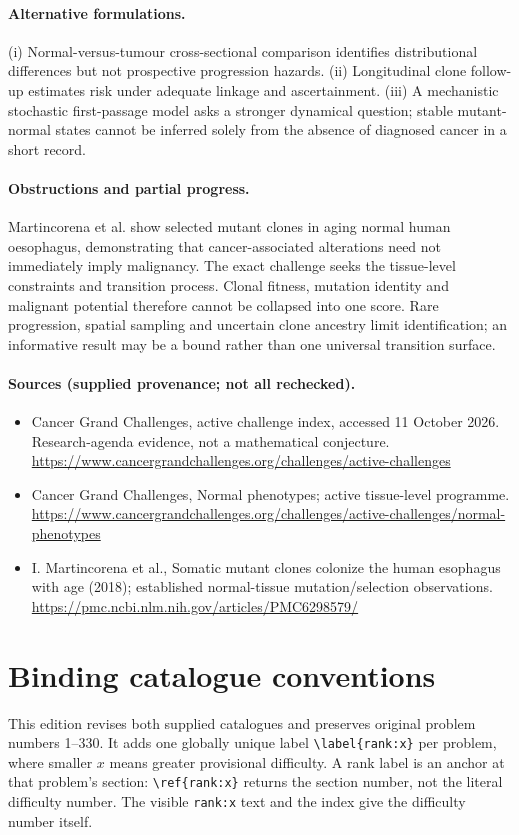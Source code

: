 \documentclass[11pt]{article}
\begin{document}
\paragraph{Alternative formulations.} (i) Normal-versus-tumour cross-sectional comparison identifies distributional differences but not prospective progression hazards. (ii) Longitudinal clone follow-up estimates risk under adequate linkage and ascertainment. (iii) A mechanistic stochastic first-passage model asks a stronger dynamical question; stable mutant-normal states cannot be inferred solely from the absence of diagnosed cancer in a short record.
\paragraph{Obstructions and partial progress.} Martincorena et al. show selected mutant clones in aging normal human oesophagus, demonstrating that cancer-associated alterations need not immediately imply malignancy. The exact challenge seeks the tissue-level constraints and transition process. Clonal fitness, mutation identity and malignant potential therefore cannot be collapsed into one score. Rare progression, spatial sampling and uncertain clone ancestry limit identification; an informative result may be a bound rather than one universal transition surface.
\paragraph{Sources (supplied provenance; not all rechecked).}
\begin{itemize}
\item Cancer Grand Challenges, active challenge index, accessed 11 October 2026. Research-agenda evidence, not a mathematical conjecture. \url{https://www.cancergrandchallenges.org/challenges/active-challenges}
\item Cancer Grand Challenges, Normal phenotypes; active tissue-level programme. \url{https://www.cancergrandchallenges.org/challenges/active-challenges/normal-phenotypes}
\item I. Martincorena et al., Somatic mutant clones colonize the human esophagus with age (2018); established normal-tissue mutation/selection observations. \url{https://pmc.ncbi.nlm.nih.gov/articles/PMC6298579/}
\end{itemize}


\section*{Binding catalogue conventions}
This edition revises both supplied catalogues and preserves original problem numbers 1--330. It adds one globally unique label \verb|\label{rank:x}| per problem, where smaller $x$ means greater provisional difficulty. A rank label is an anchor at that problem's section: \verb|\ref{rank:x}| returns the section number, not the literal difficulty number. The visible \texttt{rank:x} text and the index give the difficulty number itself.
\end{document}
